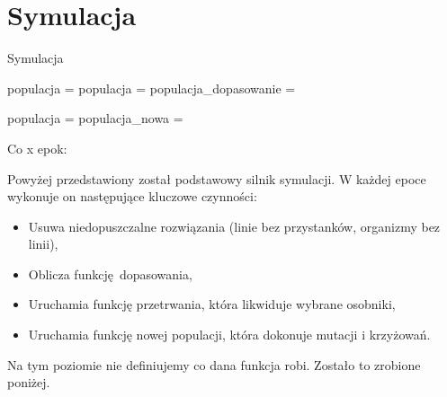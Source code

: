 \documentclass[12pt,a4paper,openright]{mwrep}
\begin{document}
\section{Symulacja}
\begin{algorithm}[H]
    \caption{Symulacja}
    \begin{algorithmic}[1]
        \State populacja = 
        \State {}
        \State populacja = 
        \State populacja\_dopasowanie = 

        \State populacja = 
        \State populacja\_nowa =  

        Co x epok:
        \State {}
        \EndFor
        \EndFunction
    \end{algorithmic}
\end{algorithm}

Powyżej przedstawiony został podstawowy silnik symulacji. W każdej epoce wykonuje on następujące kluczowe czynności:
\begin{itemize}
    \item Usuwa niedopuszczalne rozwiązania (linie bez przystanków, organizmy bez linii),
    \item Oblicza funkcję dopasowania,
    \item Uruchamia funkcję przetrwania, która likwiduje wybrane osobniki,
    \item Uruchamia funkcję nowej populacji, która dokonuje mutacji i krzyżowań.
\end{itemize}

Na tym poziomie nie definiujemy co dana funkcja robi. Zostało to zrobione poniżej.
\end{document}
